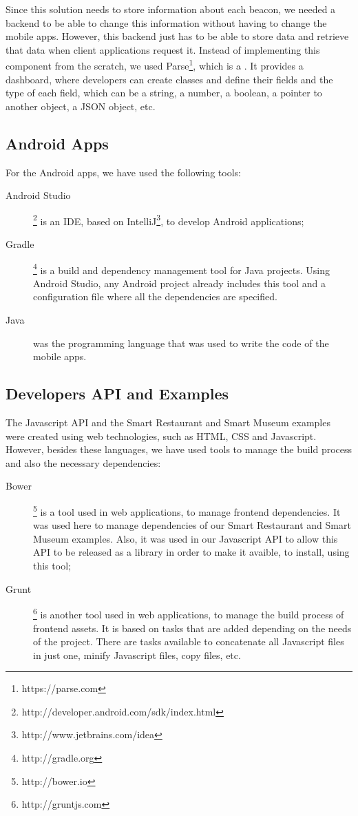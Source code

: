 Since this solution needs to store information about each beacon, we
needed a backend to be able to change this information without having
to change the mobile apps.
However, this backend just has to be able to store data and retrieve that
data when client applications request it.
Instead of implementing this component from the scratch, we used
Parse\footnote{https://parse.com}, which is a .
It provides a dashboard, where developers can create classes
and define their fields and the type of each field, which can be a string,
a number, a boolean, a pointer to another object, a \gls{JSON} object, etc.

\subsection{Android Apps}
\label{sub:implementation_tools_android_apps}
For the Android apps, we have used the following tools:
\begin{description}
  \item[Android Studio] \footnote{http://developer.android.com/sdk/index.html} is an \gls{IDE}, based on IntelliJ\footnote{http://www.jetbrains.com/idea},
  to develop Android
  applications;
  \item[Gradle] \footnote{http://gradle.org} is a build and dependency management tool for Java projects. Using Android Studio, any Android project already includes this tool and a configuration file where all the dependencies are specified.
  \item[Java] was the programming language that was used to write the code of the mobile apps.
\end{description}

\subsection{Developers \gls{API} and Examples}
\label{sub:implementation_tools_developers_api_and_examples}
The Javascript \gls{API} and the Smart Restaurant and Smart Museum examples were created using web technologies, such as \gls{HTML}, \gls{CSS} and Javascript.
However, besides these languages, we have used tools to manage the build process and also the necessary dependencies:
\begin{description}
  \item[Bower]\footnote{http://bower.io} is a tool used in web applications, to manage frontend dependencies. It was used here to manage dependencies of our Smart Restaurant and Smart Museum examples.
  Also, it was used in our Javascript \gls{API} to allow this \gls{API} to be released as a library in order to make it avaible, to install, using this tool;
  \item[Grunt]\footnote{http://gruntjs.com} is another tool used in web applications, to manage the build process of frontend assets.
  It is based on tasks that are added depending on the needs of the project.
  There are tasks available to concatenate all Javascript files in just one, minify Javascript files, copy files, etc.
\end{description}

